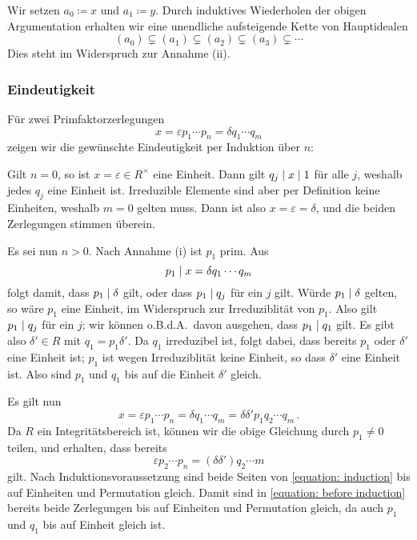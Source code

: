 Wir setzen $a_0 \coloneqq x$ und $a_1 \coloneqq y$.
Durch induktives Wiederholen der obigen Argumentation erhalten wir eine unendliche aufsteigende Kette von Hauptidealen
\[
              (a_0)
  \subsetneq  (a_1)
  \subsetneq  (a_2)
  \subsetneq  (a_3)
  \subsetneq  \dotsb
\]
Dies steht im Widerspruch zur Annahme (ii).



\subsubsection*{Eindeutigkeit}

Für zwei Primfaktorzerlegungen
\[
    x
  = \varepsilon p_1 \dotsm p_n
  = \delta q_1 \dotsm q_m
\]
zeigen wir die gewünschte Eindeutigkeit per Induktion über $n$:

Gilt $n = 0$, so ist $x = \varepsilon \in R^\times$ eine Einheit.
Dann gilt $q_j \mathrel{|} x \mathrel{|} 1$ für alle $j$, weshalb jedes $q_j$ eine Einheit ist.
Irreduzible Elemente sind aber per Definition keine Einheiten, weshalb $m = 0$ gelten muss.
Dann ist also $x = \varepsilon = \delta$, und die beiden Zerlegungen stimmen überein.

Es sei nun $n > 0$.
Nach Annahme (i) ist $p_1$ prim.
Aus
\[
            p_1
  \mathrel{|}  x
  =         \delta q_1 \dotsm q_m
\]
folgt damit, dass $p_1 \mathrel{|} \delta$ gilt, oder dass $p_1 \mathrel{|} q_j$ für ein $j$ gilt.
Würde $p_1 \mathrel{|} \delta$ gelten, so wäre $p_1$ eine Einheit, im Widerspruch zur Irreduziblität von $p_1$.
Also gilt $p_1 \mathrel{|} q_j$ für ein $j$;
wir können o.B.d.A.\ davon ausgehen, dass $p_1 \mathrel{|} q_1$ gilt.
Es gibt also $\delta' \in R$ mit $q_1 = p_1 \delta'$.
Da $q_1$ irreduzibel ist, folgt dabei, dass bereits $p_1$ oder $\delta'$ eine Einheit ist;
$p_1$ ist wegen Irreduziblität keine Einheit, so dass $\delta'$ eine Einheit ist.
Also sind $p_1$ und $q_1$ bis auf die Einheit $\delta'$ gleich.

Es gilt nun
\begin{equation}
  \label{equation: before induction}
    x
  = \varepsilon p_1 \dotsm p_n
  = \delta q_1 \dotsm q_m
  = \delta \delta' p_1 q_2 \dotsm q_m \,.
\end{equation}
Da $R$ ein Integritätsbereich ist, können wir die obige Gleichung durch $p_1 \neq 0$ teilen, und erhalten, dass bereits
\begin{equation}
  \label{equation: induction}
    \varepsilon p_2 \dotsm p_n
  = (\delta \delta') q_2 \dotsm m
\end{equation}
gilt.
Nach Induktionsvoraussetzung sind beide Seiten von \eqref{equation: induction} bis auf Einheiten und Permutation gleich.
Damit sind in \eqref{equation: before induction} bereits beide Zerlegungen bis auf Einheiten und Permutation gleich, da auch $p_1$ und $q_1$ bis auf Einheit gleich ist.

